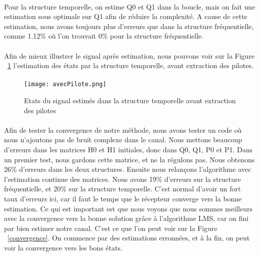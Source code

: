 \paragraph{}
Pour la structure temporelle, on estime Q0 et Q1 dans la boucle, mais on fait une estimation sous optimale sur Q1 afin de réduire la complexité. A cause de cette estimation, nous avons toujours plus d'erreurs que dans la structure fréquentielle, comme 1.12\% où l'on trouvait 0\% pour la structure fréquentielle.
\paragraph{}
Afin de mieux illustrer le signal après estimation, nous pouvons voir sur la Figure ~\ref{avecPilote} l'estimation des états par la structure temporelle, avant extraction des pilotes.
\paragraph{}
\paragraph{}
\vspace{1\baselineskip}
\begin{figure}[!h]
  \centering
  \texttt{[image: avecPilote.png]}
  \caption{Etats du signal estimés dans la structure temporelle avant extraction des pilotes }
	\label{avecPilote} 
\end{figure}
\vspace{1\baselineskip}
\paragraph{}
Afin de tester la convergence de notre méthode, nous avons tester un code où nous n'ajoutons pas de bruit complexe dans le canal. Nous mettons beaucoup d'erreurs dans les matrices H0 et H1 initiales, donc dans Q0, Q1, P0 et P1. Dans un premier test, nous gardons cette matrice, et ne la régulons pas. Nous obtenons 26\% d'erreurs dans les deux structures. Ensuite nous relançons l'algorithme avec l'estimation continue des matrices. Nous avons 19\% d'erreurs sur la structure fréquentielle, et 20\% sur la structure temporelle. C'est normal d'avoir un fort taux d'erreurs ici, car il faut le temps que le récepteur converge vers la bonne estimation. Ce qui est important est que nous voyons que nous sommes meilleurs avec la convergence vers la bonne solution grâce à l'algorithme LMS, car on fini par bien estimer notre canal. C'est ce que l'on peut voir sur la Figure ~\ref{convergence}. On commence par des estimations erronnées, et à la fin, on peut voir la convergence vers les bons états.
